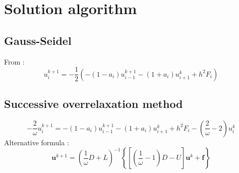 \newpage
\section{Solution algorithm}
\subsection{Gauss-Seidel}
From \cite{GounelasGS}:
\begin{equation}
u_i^{k + 1} = -\frac{1}{2} \left (-\left (1 - a_i \right) u_{i - 1}^{k + 1} - 
\left (1 + a_i \right) u_{i + 1}^k + h^2F_i \right)
\end{equation}

\subsection{Successive overrelaxation method}
\begin{equation}
-\frac{2}{\omega} u_i^{k + 1} = -\left (1 - a_i \right) u_{i - 1}^{k + 1} - 
\left (1 + a_i \right) u_{i + 1}^k + h^2F_i - 
\left (\frac{2}{\omega} - 2 \right) u_i^k
\end{equation}
Alternative formula \cite{LiuSOR}:
\begin{equation}
\mathbf{u}^{k + 1} = \left (\frac{1}{\omega} D + L \right)^{-1}
\left \{\left [\left (\frac{1}{\omega} - 1 \right) D - U \right]
\mathbf{u}^k + \mathbf{f} \right\}
\end{equation}